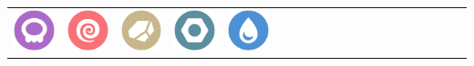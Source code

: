\begin{table}[h]
\begin{tabular}{c c c c c c c c c c c c c c c c c c c c}
    \includegraphics[scale=.1]{images/poison.png} &
    \includegraphics[scale=.1]{images/psychic.png} &
    \includegraphics[scale=.1]{images/rock.png} &
    \includegraphics[scale=.1]{images/steel.png} &
    \includegraphics[scale=.1]{images/water.png} &
    \\

\end{tabular}
\end{table}

